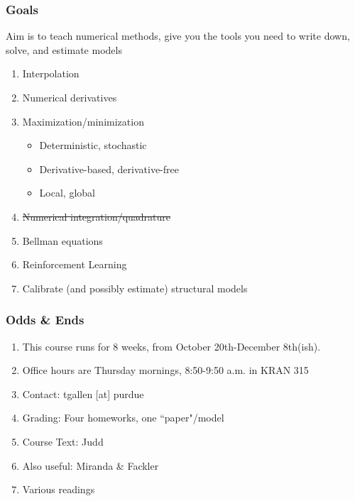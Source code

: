 \documentclass{beamer}
\author{Trevor Gallen}
\date{}
\begin{document}
\begin{frame}
\titlepage
\end{frame}

\begin{frame}
\frametitle[alignment=center]{Goals}
Aim is to teach numerical methods, give you the tools you need to write down, solve, and estimate models
\bigskip
\begin{enumerate}
\item Interpolation 
\bigskip
\item Numerical derivatives
\bigskip
\item Maximization/minimization 
\bigskip
\begin{itemize}
\item Deterministic, stochastic 
\bigskip
\item Derivative-based, derivative-free
\bigskip
\item Local, global
\bigskip
\end{itemize}
\item \sout{Numerical integration/quadrature}
\bigskip
\item Bellman equations 
\bigskip
\item  Reinforcement Learning
\bigskip
\item Calibrate (and possibly estimate) structural models 
\end{enumerate}
\end{frame}

\begin{frame}
\frametitle[alignment=center]{Odds \& Ends}
\begin{enumerate}
\item This course runs for 8 weeks, from October 20th-December 8th(ish).\\
\bigskip
\item Office hours are Thursday mornings, 8:50-9:50 a.m. in KRAN 315
\bigskip
\item Contact:  tgallen [at] purdue
\bigskip
\item Grading:  Four homeworks, one ``paper"/model
\bigskip
\item Course Text:  Judd
\bigskip
\item Also useful:  Miranda \& Fackler
\bigskip
\item Various readings
\end{enumerate}
\end{frame}
\end{document}
